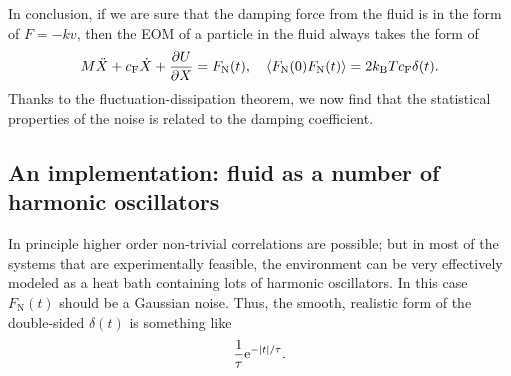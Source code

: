 \documentclass[hyperref, a4paper]{article}
\newcommand*{\ee}{\mathrm{e}}
\newcommand*{\kB}{k_{\text{B}}}
\newcommand{\cf}{c_{\text{F}}}
\newcommand{\fn}{F_{\text{N}}}
\begin{document}
In conclusion, if we are sure that the damping force from the fluid 
is in the form of $F = - k v$,
then the EOM of a particle in the fluid always takes the form of 
\begin{equation}
    M \ddot{X} + \cf \dot{X} + \pdv{U}{X} = \fn(t), \quad 
    \expval{\fn(0) \fn(t)} = 2 \kB T \cf \delta(t).
    \label{eq:langevin-mechanic}
\end{equation} 
Thanks to the fluctuation-dissipation theorem,
we now find that the statistical properties of the noise 
is related to the damping coefficient.

\subsection{An implementation: fluid as a number of harmonic oscillators}

In principle higher order non-trivial correlations are possible; 
but in most of the systems that are experimentally feasible,
the environment can be very effectively modeled as 
a heat bath containing lots of harmonic oscillators.
In this case $\fn(t)$ should be a Gaussian noise.
Thus, the smooth, realistic form of the double-sided $\delta(t)$ is something like 
\begin{equation}
    \frac{1}{\tau} \ee^{- \abs*{t} / \tau}.
\end{equation}
\end{document}
